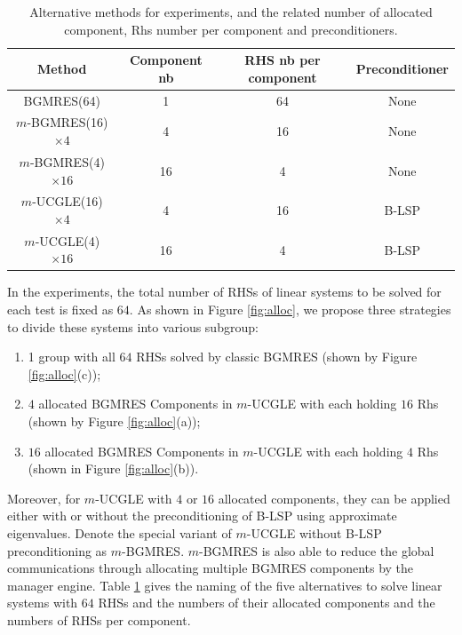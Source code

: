 \begin{table}[htbp]
	\renewcommand{\arraystretch}{1.4}
	\small	
	\caption{Alternative methods for experiments, and the related number of allocated component, Rhs number per component and preconditioners.}
	\label{allocname}
	\centering
	\begin{tabular}{c|c|c|c}
		\toprule
		\cellcolor{gray!50}Method & \cellcolor{gray!50}Component nb & \cellcolor{gray!50}RHS nb per component & \cellcolor{gray!50}Preconditioner  \\
		\midrule
		BGMRES(64)  &1& 64 & None\\
		\cellcolor{gray!20}$m$-BGMRES(16)$\times 4$ &\cellcolor{gray!20}4 & \cellcolor{gray!20}16 & \cellcolor{gray!20}None  \\
		$m$-BGMRES(4)$\times 16$ & 16 & 4 & None   \\
		\cellcolor{gray!20}$m$-UCGLE(16)$\times 4$ & \cellcolor{gray!20}4 & \cellcolor{gray!20}16 & \cellcolor{gray!20}B-LSP   \\
		$m$-UCGLE(4)$\times 16$ & 16 & 4 & B-LSP  \\
		\bottomrule
	\end{tabular}
	\label{name}
\end{table}

In the experiments, the total number of RHSs of linear systems to be solved for each test is fixed as $64$. As shown in Figure \ref{fig:alloc}, we propose three strategies to divide these systems into various subgroup: 

\begin{enumerate}
	\item 1 group with all $64$ RHSs solved by classic BGMRES (shown by Figure \ref{fig:alloc}(c));
	\item  $4$ allocated BGMRES Components in $m$-UCGLE with each holding $16$ Rhs (shown by Figure \ref{fig:alloc}(a));
	\item $16$ allocated BGMRES Components in $m$-UCGLE with each holding $4$ Rhs (shown in Figure \ref{fig:alloc}(b)).
\end{enumerate}

Moreover, for $m$-UCGLE with $4$ or $16$ allocated components, they can be applied either with or without the preconditioning of B-LSP using approximate eigenvalues. Denote the special variant of $m$-UCGLE without B-LSP preconditioning as $m$-BGMRES. $m$-BGMRES is also able to reduce the global communications through allocating multiple BGMRES components by the manager engine. Table \ref{name} gives the naming of the five alternatives to solve linear systems with $64$ RHSs and the numbers of their allocated components and the numbers of RHSs per component.

